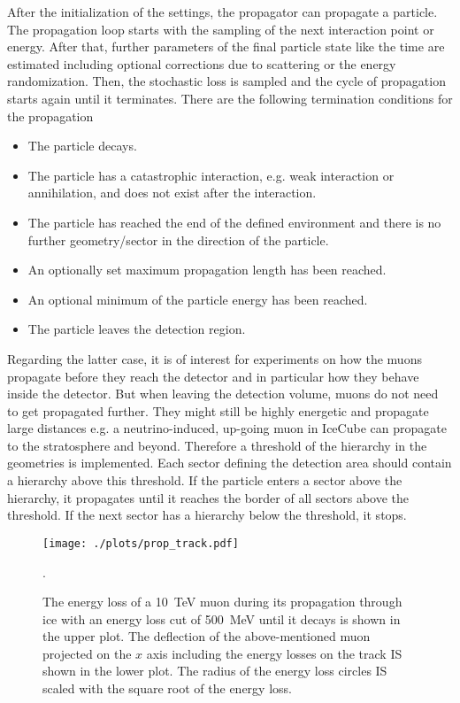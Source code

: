 After the initialization of the settings, the propagator can propagate a particle.
The propagation loop starts with the sampling of the next interaction point or energy.
After that, further parameters of the final particle state like the time are estimated including optional corrections due to scattering or the energy randomization.
Then, the stochastic loss is sampled and the cycle of propagation starts again until it terminates.
There are the following termination conditions for the propagation
\begin{itemize}
    \item The particle decays.
    \item The particle has a catastrophic interaction, e.g. weak interaction or annihilation, and does not exist after the interaction.
    \item The particle has reached the end of the defined environment and there is no further geometry/sector in the direction of the particle.
    \item An optionally set maximum propagation length has been reached.
    \item An optional minimum of the particle energy has been reached.
    \item The particle leaves the detection region.
\end{itemize}
Regarding the latter case, it is of interest for experiments on how the muons propagate before they reach the detector and in particular how they behave inside the detector.
But when leaving the detection volume, muons do not need to get propagated further.
They might still be highly energetic and propagate large distances e.g. a neutrino-induced, up-going muon in IceCube can propagate to the stratosphere and beyond.
Therefore a threshold of the hierarchy in the geometries is implemented.
Each sector defining the detection area should contain a hierarchy above this threshold.
If the particle enters a sector above the hierarchy, it propagates until it reaches the border of all sectors above the threshold.
If the next sector has a hierarchy below the threshold, it stops.
\begin{figure}
    \centering
    \texttt{[image: ./plots/prop\_track.pdf]}
    \caption{The energy loss of a \SI{10}{TeV} muon during its propagation through ice with an energy loss cut of \SI{500}{MeV} until it decays is shown in the upper plot. The deflection of the above-mentioned muon projected on the $x$ axis including the energy losses on the track IS shown in the lower plot. The radius of the energy loss circles IS scaled with the square root of the energy loss.}
    \label{fig:prop_track}.
\end{figure}

